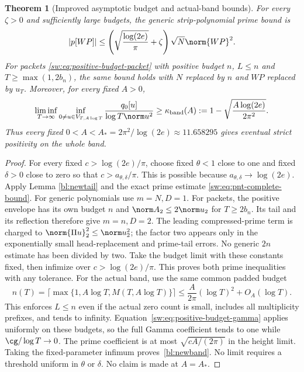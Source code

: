 \documentclass[11pt,a4paper]{article}
\numberwithin{equation}{section}
\newtheorem{theorem}{Theorem}[section]
\theoremstyle{definition}\newtheorem{definition}[theorem]{Definition}
\theoremstyle{remark}\newtheorem{remark}[theorem]{Remark}
\begin{document}
\begin{theorem}[Improved asymptotic budget and actual-band bounds]\label{bl:improvement}
For every $\zeta>0$ and sufficiently large budgets, the generic strip-polynomial prime bound is
\begin{equation}
 |p[WP]|\le\left(\sqrt{\frac{\log(2e)}\pi}+\zeta\right)\sqrt N\norm{WP}^2.
\end{equation}
For packets \eqref{sw:eq:positive-budget-packet} with positive budget $n$, $L\le n$ and $T\ge\max(1,2b_n)$, the same bound holds with $N$ replaced by $n$ and $WP$ replaced by $u_T$. Moreover, for every fixed $A>0$,
\begin{equation}\label{bl:newband}
 \liminf_{T\to\infty}\inf_{0\ne u\in V_{T,A\log T}}
 \frac{q_0[u]}{\log T\norm u^2}
 \ge\kappa_{\rm band}(A):=1-\sqrt{\frac{A\log(2e)}{2\pi^2}}.
\end{equation}
Thus every fixed $0<A<A_*=2\pi^2/\log(2e)\approx11.658295$ gives eventual strict positivity on the whole band.
\end{theorem}
\begin{proof}
For every fixed $c>\log(2e)/\pi$, choose fixed $\theta<1$ close to one and fixed $\delta>0$ close to zero so that $c>a_{\theta,\delta}/\pi$. This is possible because $a_{\theta,\delta}\to\log(2e)$. Apply Lemma \ref{bl:newtail} and the exact prime estimate \eqref{sw:eq:pnt-complete-bound}. For generic polynomials use $m=N,D=1$. For packets, the positive envelope has its own budget $n$ and $\norm A_2\le2\norm u_2$ for $T\ge2b_n$. Its tail and its reflection therefore give $m=n,D=2$. The leading compressed-prime term is charged to $\norm{\Pi u}_2^2\le\norm u_2^2$; the factor two appears only in the exponentially small head-replacement and prime-tail errors. No generic $2n$ estimate has been divided by two. Take the budget limit with these constants fixed, then infimize over $c>\log(2e)/\pi$. This proves both prime inequalities with any tolerance. For the actual band, use the same common padded budget
\[
 n(T)=\lceil\max\{1,A\log T,M(T,A\log T)\}\rceil
 \le\frac{A}{2\pi}(\log T)^2+O_A(\log T).
\]
This enforces $L\le n$ even if the actual zero count is small, includes all multiplicity prefixes, and tends to infinity. Equation~\eqref{sw:eq:positive-budget-gamma} applies uniformly on these budgets, so the full Gamma coefficient tends to one while $\cg/\log T\to0$. The prime coefficient is at most $\sqrt{cA/(2\pi)}$ in the height limit. Taking the fixed-parameter infimum proves~\eqref{bl:newband}. No limit requires a threshold uniform in $\theta$ or $\delta$. No claim is made at $A=A_*$.
\end{proof}
\end{document}
